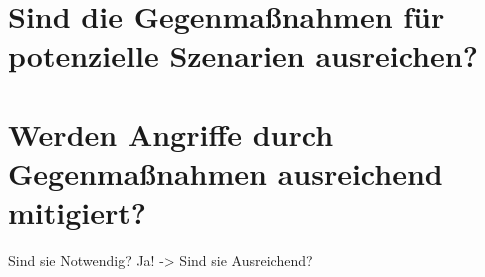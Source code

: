 \documentclass[final,bibliography=totocnumbered]{include/sikseminar}
\begin{document}
\section{Sind die Gegenmaßnahmen für potenzielle Szenarien ausreichen?}\label{sec:diskussion}
\section{Werden Angriffe durch Gegenmaßnahmen ausreichend mitigiert?}\label{sec:diskussionB}

Sind sie Notwendig? Ja! -> Sind sie Ausreichend?


\newpage

\printbibliography
\newpage
\end{document}
